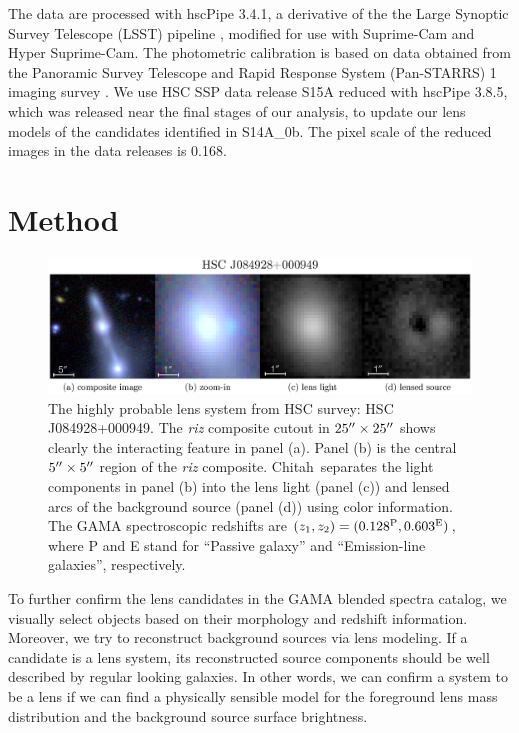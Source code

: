 \documentclass[apj]{emulateapj}
\def\chitah{{\sc Chitah}}
\begin{document}
The data are processed with hscPipe 3.4.1, a derivative of the 
the Large Synoptic Survey Telescope (LSST) pipeline \citep{IvezicEtal08,AxelrodEtal10}, modified for use with Suprime-Cam and Hyper Suprime-Cam.
The photometric calibration is based on data obtained from the Panoramic Survey Telescope and Rapid Response System (Pan-STARRS) 1 imaging survey \citep{SchlaflyEtal12,TonryEtal12,MagnierEtal13}.
We use HSC SSP 
data release S15A reduced with hscPipe 3.8.5, which was released near the final stages of our analysis, to update our lens models of the 
candidates identified in S14A\_0b. 
The pixel scale of the reduced images in the data releases is 0.168\arcsec.

\section{Method}
\label{sec:method}

\begin{figure}
\centering
\includegraphics[scale=0.7]{figure/new_lens.eps}
\caption{
The highly probable lens system from HSC survey: HSC J084928+000949. 
The {\it riz} composite cutout in $25\mbox{$^{\prime\prime}$} \times 25\mbox{$^{\prime\prime}$}$ shows clearly the interacting feature in panel (a). 
Panel (b) is the central $5\mbox{$^{\prime\prime}$} \times 5\mbox{$^{\prime\prime}$}$ region of the {\it riz} composite.
\chitah\ separates the light components in panel (b) into the lens light (panel (c)) and lensed arcs of the background source (panel (d)) using color information.
The GAMA spectroscopic redshifts are $(z_1, z_2) = (0.128^{\rm P},0.603^{\rm E})$,  where P and E stand for ``Passive galaxy'' and ``Emission-line galaxies'', respectively.
}
\label{fig:new_lens}
\end{figure}

To further confirm the lens candidates in the GAMA blended spectra catalog, we visually select objects based on their morphology and redshift information.
Moreover, we try to reconstruct background sources via lens modeling.
If a candidate is a lens system, its reconstructed source components should be well described by regular looking galaxies.
In other words, we can confirm a system to be a lens if we can find a physically sensible model 
for the foreground lens mass distribution and the background source surface brightness.
\end{document}
